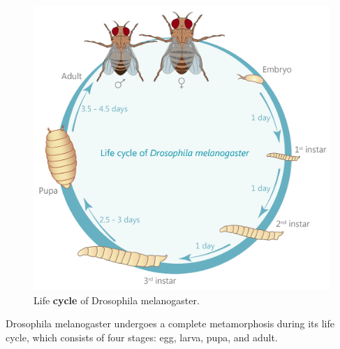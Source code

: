 \documentclass{report}
\begin{document}
	\begin{figure}[h!]
		\centering
		\includegraphics[width=0.7\columnwidth]{resources/model_organism_fig_1.png}
		\caption{Life \textbf{cycle} of Drosophila melanogaster. \cite{example_website}}
		\label{fig:Life_cycle_of_fruit_fly}
	\end{figure}
	
	Drosophila melanogaster undergoes a complete metamorphosis during its life cycle, which consists of four stages: egg, larva, pupa, and adult.
	
\end{document}

